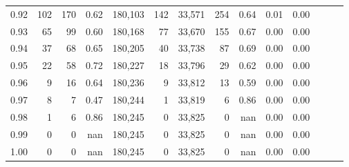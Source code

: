 \begin{tabular}{rrrrrrrrrrrrrr}
0.92 &    102 &  170 &  0.62 &  180,103 &      142 &  33,571 &     254 &  0.64 &  0.01 &      0.00 \\
0.93 &     65 &   99 &  0.60 &  180,168 &       77 &  33,670 &     155 &  0.67 &  0.00 &      0.00 \\
0.94 &     37 &   68 &  0.65 &  180,205 &       40 &  33,738 &      87 &  0.69 &  0.00 &      0.00 \\
0.95 &     22 &   58 &  0.72 &  180,227 &       18 &  33,796 &      29 &  0.62 &  0.00 &      0.00 \\
0.96 &      9 &   16 &  0.64 &  180,236 &        9 &  33,812 &      13 &  0.59 &  0.00 &      0.00 \\
0.97 &      8 &    7 &  0.47 &  180,244 &        1 &  33,819 &       6 &  0.86 &  0.00 &      0.00 \\
0.98 &      1 &    6 &  0.86 &  180,245 &        0 &  33,825 &       0 &   nan &  0.00 &      0.00 \\
0.99 &      0 &    0 &   nan &  180,245 &        0 &  33,825 &       0 &   nan &  0.00 &      0.00 \\
1.00 &      0 &    0 &   nan &  180,245 &        0 &  33,825 &       0 &   nan &  0.00 &      0.00 \\
\bottomrule
\end{tabular}

